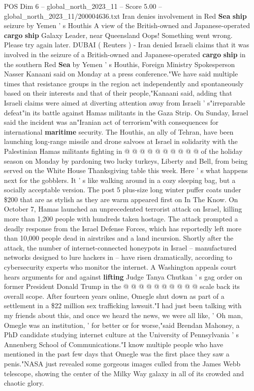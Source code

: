 \begin{textsample}{POS Dim 6 – global\_north\_2023\_11 – Score 5.00 – global\_north\_2023\_11/200004636.txt}  \label{ex:f6_pos_258}
Iran denies involvement in Red \textbf{Sea} \textbf{ship} seizure by Yemen ' s Houthis A view of the British-owned and Japanese-operated \textbf{cargo} \textbf{ship} Galaxy Leader, near Queensland Oops!
Something went wrong.
Please try again later.
DUBAI ( Reuters ) - Iran denied Israeli claims that it was involved in the seizure of a British-owned and Japanese-operated \textbf{cargo} \textbf{ship} in the southern Red \textbf{Sea} by Yemen ' s Houthis, Foreign Ministry Spokesperson Nasser Kanaani said on Monday at a press conference."We have said multiple times that resistance groups in the region act independently and spontaneously based on their interests and that of their people,"Kanaani said, adding that Israeli claims were aimed at diverting attention away from Israeli ' s"irreparable defeat"in its battle against Hamas militants in the Gaza Strip.
On Sunday, Israel said the incident was an"Iranian act of terrorism"with consequences for international \textbf{maritime} security.
The Houthis, an ally of Tehran, have been launching long-range missile and drone salvoes at Israel in solidarity with the Palestinian Hamas militants fighting in @ @ @ @ @ @ @ @ @ @ of the holiday season on Monday by pardoning two lucky turkeys, Liberty and Bell, from being served on the White House Thanksgiving table this week.
Here ' s what happens next for the gobblers.
It ' s like walking around in a cozy sleeping bag, but a socially acceptable version.
The post 5 plus-size long winter puffer coats under \$200 that are as stylish as they are warm appeared first on In The Know.
On October 7, Hamas launched an unprecedented terrorist attack on Israel, killing more than 1,200 people with hundreds taken hostage.
The attack prompted a deadly response from the Israel Defense Forces, which has reportedly left more than 10,000 people dead in airstrikes and a land incursion.
Shortly after the attack, the number of internet-connected honeypots in Israel -- manufactured networks designed to lure hackers in -- have risen dramatically, according to cybersecurity experts who monitor the internet.
A Washington appeals court hears arguments for and against \textbf{lifting} Judge Tanya Chutkan ' s gag order on former President Donald Trump in the @ @ @ @ @ @ @ @ @ @ scale back its overall scope.
After fourteen years online, Omegle shut down as part of a settlement in a \$22 million sex trafficking lawsuit."I had just been talking with my friends about this, and once we heard the news, we were all like, ' Oh man, Omegle was an institution, ' for better or for worse,"said Brendan Mahoney, a PhD candidate studying internet culture at the University of Pennsylvania ' s Annenberg School of Communications."I know multiple people who have mentioned in the past few days that Omegle was the first place they saw a penis."NASA just revealed some gorgeous images culled from the James Webb telescope, showing the center of the Milky Way galaxy in all of its crowded and chaotic glory.

\end{textsample}

